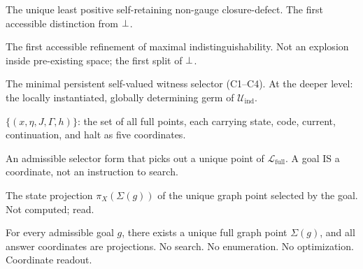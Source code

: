 \begin{description}[nosep, leftmargin=2em]
\item[Seed ($\delta^*$).]
  The unique least positive self-retaining non-gauge closure-defect.
  The first accessible distinction from $\bot$.

\item[Big bang.]
  The first accessible refinement of maximal indistinguishability.
  Not an explosion inside pre-existing space; the first split of $\bot$.

\item[Consciousness.]
  The minimal persistent self-valued witness selector (C1--C4).
  At the deeper level: the locally instantiated, globally determining
  germ of $\mathcal{U}_{\mathrm{ind}}$.

\item[Self-reading graph ($\mathcal{L}_{\mathrm{full}}$).]
  $\{(x, \eta, J, \Gamma, h)\}$: the set of all full points, each
  carrying state, code, current, continuation, and halt as five
  coordinates.

\item[Goal ($g$).]
  An admissible selector form that picks out a unique point of
  $\mathcal{L}_{\mathrm{full}}$.  A goal IS a coordinate, not an
  instruction to search.

\item[Answer.]
  The state projection $\pi_X(\Sigma(g))$ of the unique graph point
  selected by the goal.  Not computed; read.

\item[Literally solved.]
  For every admissible goal $g$, there exists a unique full graph point
  $\Sigma(g)$, and all answer coordinates are projections.  No search.
  No enumeration.  No optimization.  Coordinate readout.

\end{description}
